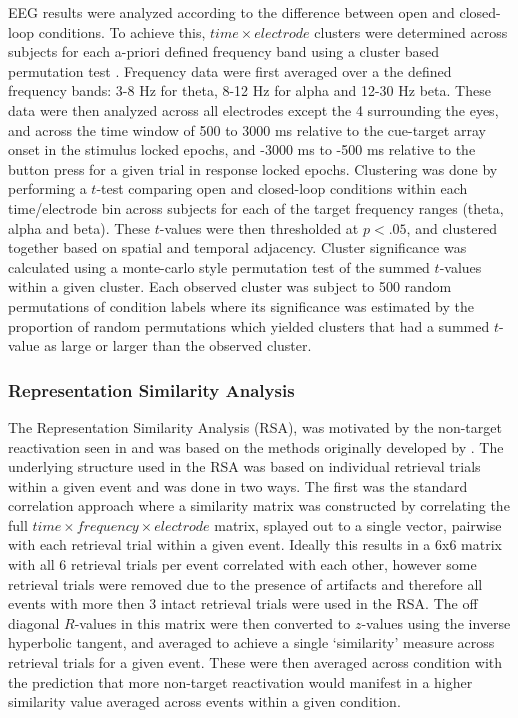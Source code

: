 \documentclass[11pt, titlepage, twoside]{article}
\begin{document}
EEG results were analyzed according to the difference between open and closed-loop conditions.  To achieve this, $time \times electrode$ clusters were determined across subjects for each a-priori defined frequency band using a cluster based permutation test  \parencite{MarisOostenveld07}.  Frequency data were first averaged over a the defined frequency bands: 3-8 Hz for theta, 8-12 Hz for alpha and 12-30 Hz beta.  These data were then analyzed across all electrodes except the 4 surrounding the eyes, and across the time window of 500 to 3000 ms relative to the cue-target array onset in the stimulus locked epochs, and -3000 ms to -500 ms relative to the button press for a given trial in response locked epochs.  Clustering was done by performing a $t$-test comparing open and closed-loop conditions within each time/electrode bin across subjects for each of the target frequency ranges (theta, alpha and beta).  These $t$-values were then thresholded at $p<.05$, and clustered together based on spatial and temporal adjacency.   Cluster significance was calculated using a monte-carlo style permutation test of the summed $t$-values within a given cluster.  Each observed cluster was subject to 500 random permutations of condition labels where its significance was estimated by the proportion of random permutations which yielded clusters that had a summed $t$-value as large or larger than the observed cluster.

\subsubsection{Representation Similarity Analysis}
\label{sec:deevRSA}
The Representation Similarity Analysis (RSA), was motivated by the non-target reactivation seen in \textcite{HornerBisbyBushEtAl15} and was based on the methods originally developed by \textcite{KriegeskorteMurBandettini08}.  The underlying structure used in the RSA was based on individual retrieval trials within a given event and was done in two ways.  The first was the standard correlation approach where a similarity matrix was constructed by correlating the full $time \times frequency \times electrode$ matrix, splayed out to a single vector, pairwise with each retrieval trial within a given event.  Ideally this results in a 6x6 matrix with all 6 retrieval trials per event correlated with each other, however some retrieval trials were removed due to the presence of artifacts and therefore all events with more then 3 intact retrieval trials were used in the RSA.  The off diagonal $R$-values in this matrix were then converted to $z$-values using the inverse hyperbolic tangent, and averaged to achieve a single `similarity' measure across retrieval trials for a given event.  These were then averaged across condition with the prediction that more non-target reactivation would manifest in a higher similarity value averaged across events within a given condition.
\end{document}
